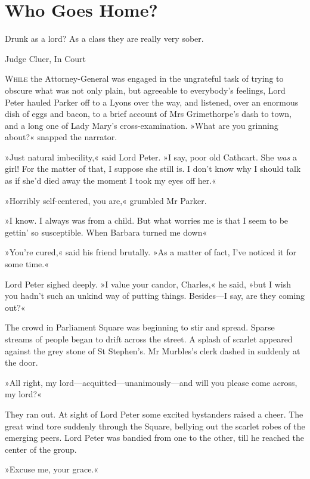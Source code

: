 
\chapter{Who Goes Home?}

\epigraph{Drunk as a lord? As a class they are really very sober.}{Judge Cluer, In Court}


\lettrine[lines=4]{W}{hile} the Attorney-General was engaged in the ungrateful task of trying to obscure what was not only plain, but agreeable to everybody's feelings, Lord Peter hauled Parker off to a Lyons over the way, and listened, over an enormous dish of eggs and bacon, to a brief account of Mrs Grimethorpe's dash to town, and a long one of Lady Mary's cross-examination.
»What are you grinning about?« snapped the narrator.

»Just natural imbecility,« said Lord Peter. »I say, poor old Cathcart.  She \textit{was} a girl! For the matter of that, I suppose she still is. I don't know why I should talk as if she'd died away the moment I took my eyes off her.«

»Horribly self-centered, you are,« grumbled Mr Parker.

»I know. I always was from a child. But what worries me is that I seem to be gettin' so susceptible. When Barbara turned me down\longdash«

»You're cured,« said his friend brutally. »As a matter of fact, I've noticed it for some time.«

Lord Peter sighed deeply. »I value your candor, Charles,« he said, »but I wish you hadn't such an unkind way of putting things. Besides\allowbreak---\allowbreak I say, are they coming out?«

The crowd in Parliament Square was beginning to stir and spread. Sparse streams of people began to drift across the street. A splash of scarlet appeared against the grey stone of St Stephen's. Mr Murbles's clerk dashed in suddenly at the door.

»All right, my lord\allowbreak---\allowbreak acquitted---unanimously\allowbreak---\allowbreak and will you please come across, my lord?«

They ran out. At sight of Lord Peter some excited bystanders raised a cheer. The great wind tore suddenly through the Square, bellying out the scarlet robes of the emerging peers. Lord Peter was bandied from one to the other, till he reached the center of the group.

»Excuse me, your grace.«

